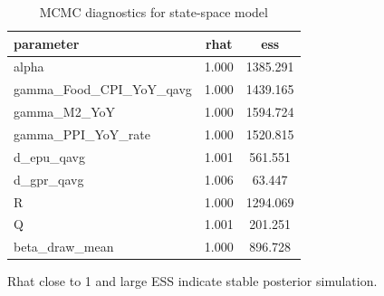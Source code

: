 \begin{table}[!htbp]
\centering
\caption{MCMC diagnostics for state-space model}
\label{tab:mcmc_diagnostics}
\begin{threeparttable}
\begin{tabular}{lcc}
\toprule
parameter & rhat & ess \\
\midrule
alpha & 1.000 & 1385.291 \\
gamma\_Food\_CPI\_YoY\_qavg & 1.000 & 1439.165 \\
gamma\_M2\_YoY & 1.000 & 1594.724 \\
gamma\_PPI\_YoY\_rate & 1.000 & 1520.815 \\
d\_epu\_qavg & 1.001 & 561.551 \\
d\_gpr\_qavg & 1.006 & 63.447 \\
R & 1.000 & 1294.069 \\
Q & 1.001 & 201.251 \\
beta\_draw\_mean & 1.000 & 896.728 \\
\bottomrule
\end{tabular}
\begin{tablenotes}[flushleft]
\footnotesize
\item Rhat close to 1 and large ESS indicate stable posterior simulation.
\end{tablenotes}
\end{threeparttable}
\end{table}
